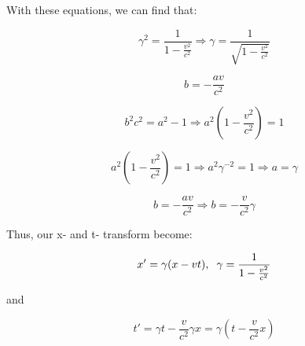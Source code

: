 \documentclass{article}
\begin{document}
With these equations, we can find that:

\begin{equation}
\gamma^2 = \frac{1}{1 - \frac{v^2}{c^2}} \Rightarrow \gamma = \frac{1}{\sqrt{1 - \frac{v^2}{c^2}}}
\end{equation}

\begin{equation}
b = -\frac{av}{c^2}
\end{equation}

\begin{equation}
b^2c^2 = a^2 - 1 \Rightarrow a^2 \left(1 - \frac{v^2}{c^2}\right) = 1
\end{equation}

\begin{equation}
a^2\left(1 - \frac{v^2}{c^2}\right) = 1 \Rightarrow a^2\gamma^{-2} = 1 \Rightarrow a = \gamma
\end{equation}

\begin{equation}
b = -\frac{av}{c^2} \Rightarrow b = -\frac{v}{c^2}\gamma
\end{equation}

Thus, our x- and t- transform become:

\[
x' = \gamma(x - vt), \hspace{2mm} \gamma = \frac{1}{1 - \frac{v^2}{c^2}}
\]

and

\[
t' = \gamma t - \frac{v}{c^2}\gamma x = \gamma \left( t - \frac{v}{c^2}x \right)
\]
\end{document}
